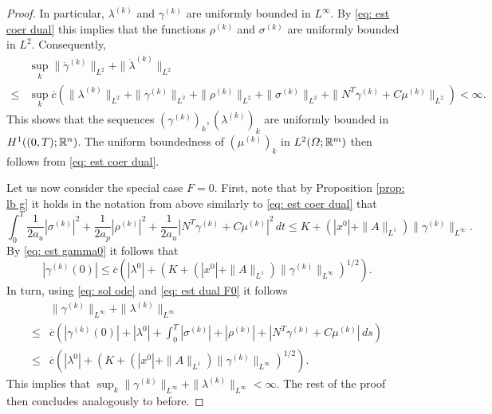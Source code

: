 \documentclass[11pt]{article}
\begin{document}
\begin{proof}
In particular, $\lambda^{(k)}$ and $\gamma^{(k)}$ are uniformly bounded in $L^{\infty}$. By \eqref{eq: est coer dual} this implies that the functions $\rho^{(k)}$ and $\sigma^{(k)}$ are uniformly bounded in $L^2$. Consequently, 
\begin{align*} 
&\sup_k \| \dot{\gamma}^{(k)} \|_{L^2} + \| \dot{\lambda}^{(k)} \|_{L^2}  \\ \leq &\sup_k \overline{c} \left( \| \lambda^{(k)} \|_{L^2} + \| \gamma^{(k)} \|_{L^2} + \| \rho^{(k)} \|_{L^2} + \| \sigma^{(k)} \|_{L^2} +  \| N^T \gamma^{(k)} + C \mu^{(k)}\|_{L^2} \right) < \infty.
\end{align*}
This shows that the sequences $(\gamma^{(k)})_k, (\lambda^{(k)})_k$ are uniformly bounded in $H^1((0,T);\mathbb R^n)$. The uniform boundedness of $(\mu^{(k)})_k$ in $L^2(\Omega;\mathbb R^m)$ then follows from \eqref{eq: est coer dual}. 

Let us now consider the special case $F=0$. 
First, note that by Proposition \ref{prop: lb g} it holds in the notation from above similarly to \eqref{eq: est coer dual} that
\begin{equation} \label{eq: est dual F0}
\int_0^T \frac1{2a_u} |\sigma^{(k)}|^2 + \frac1{2a_p} |\rho^{(k)} |^2 + \frac1{2a_u} |N^T\gamma^{(k)} + C \mu^{(k)}|^2  \, dt \leq K + (|x^0| + \| A \|_{L^1}) \| \gamma^{(k)} \|_{L^{\infty}}. 
\end{equation}
By \eqref{eq: est gamma0} it follows that
\[
|\gamma^{(k)}(0)| \leq \overline{c} \left( |\lambda^0| + ( K + (|x^0| + \| A \|_{L^1}) \| \gamma^{(k)} \|_{L^{\infty}})^{1/2} \right).
\]
In turn, using \eqref{eq: sol ode} and \eqref{eq: est dual F0} it follows
\begin{align}
     &\| \gamma^{(k)} \|_{L^{\infty}} + \| \lambda^{(k)} \|_{L^{\infty}} \\
    \leq &\overline{c} \left( |\gamma^{(k)}(0)| +  |\lambda^0| + \int_0^T |\sigma^{(k)}| + |\rho^{(k)}| + |N^T\gamma^{(k)} + C \mu^{(k)}| \, ds \right) \\
    \leq &\overline{c} \left( |\lambda^0| + ( K + (|x^0| + \| A \|_{L^1}) \| \gamma^{(k)} \|_{L^{\infty}})^{1/2} \right).
\end{align}
This implies that $\sup_k \| \gamma^{(k)} \|_{L^{\infty}} + \| \lambda^{(k)} \|_{L^{\infty}} < \infty$. The rest of the proof then concludes analogously to before.


\end{proof}
\end{document}
